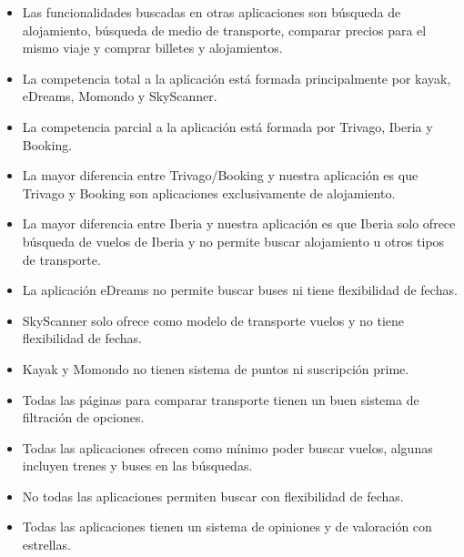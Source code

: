 \begin{itemize}
    \item Las funcionalidades buscadas en otras aplicaciones son búsqueda de alojamiento, búsqueda de medio de transporte, comparar precios para el mismo viaje y comprar billetes y alojamientos.
    \item La competencia total a la aplicación está formada principalmente por kayak, eDreams, Momondo y SkyScanner.
    \item La competencia parcial a la aplicación está formada por Trivago, Iberia y Booking.
    \item La mayor diferencia entre Trivago/Booking y nuestra aplicación es que Trivago y Booking son aplicaciones exclusivamente de alojamiento.
    \item La mayor diferencia entre Iberia y nuestra aplicación es que Iberia solo ofrece búsqueda de vuelos de Iberia y no permite buscar alojamiento u otros tipos de transporte.
    \item La aplicación eDreams no permite buscar buses ni tiene flexibilidad de fechas.
    \item SkyScanner solo ofrece como modelo de transporte vuelos y no tiene flexibilidad de fechas.
    \item Kayak y Momondo no tienen sistema de puntos ni suscripción prime.
    \item Todas las páginas para comparar transporte tienen un buen sistema de filtración de opciones.
    \item Todas las aplicaciones ofrecen como mínimo poder buscar vuelos, algunas incluyen trenes y buses en las búsquedas.
    \item No todas las aplicaciones permiten buscar con flexibilidad de fechas.
    \item Todas las aplicaciones tienen un sistema de opiniones y de valoración con estrellas.
\end{itemize}